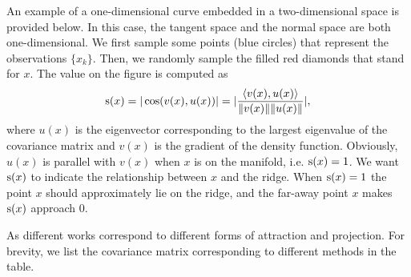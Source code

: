 \documentclass[aos,preprint]{imsart}
\theoremstyle{remark}
\begin{document}
An example of a one-dimensional curve embedded in a two-dimensional space is provided below. In this case, the tangent space and the normal space are both one-dimensional.
We first sample some points (blue circles) that represent the observations $\{x_k\}$. Then, we randomly sample the filled red diamonds that stand for $x$. The value on the figure is computed as
\[
{\rm s}(x) =  |\cos(v(x),u(x))| = |\frac{\langle v(x), u(x) \rangle}{\|v(x)\|\|u(x)\|}|,
\]
where $u(x)$ is the eigenvector corresponding to the largest eigenvalue of the covariance matrix and $v(x)$ is the gradient of the density function. Obviously, $u(x)$ is parallel with $v(x)$ when $x$ is on the manifold, i.e. ${\rm s}(x)=1$. We want ${\rm s}(x)$ to indicate the relationship between $x$ and the ridge. When ${\rm s}(x)=1$ the point $x$ should approximately lie on the ridge, and the far-away point $x$ makes ${\rm s}(x)$ approach $0$. 

As different works correspond to different forms of attraction and projection. For brevity, we list the covariance matrix corresponding to different methods in the table.
% 
 
\end{document}
